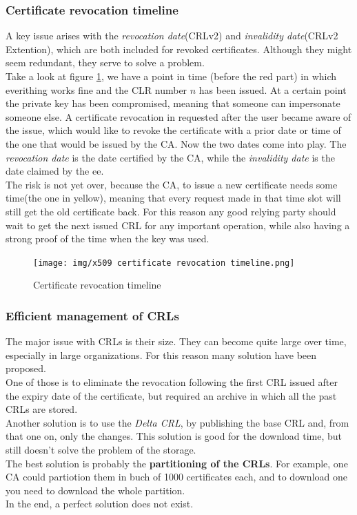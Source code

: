 \subsubsection{Certificate revocation timeline}
A key issue arises with the \textit{revocation date}(CRLv2) and
\textit{invalidity date}(CRLv2 Extention), which are both included for
revoked certificates. Although they might seem redundant, they serve
to solve a problem.\\
Take a look at figure \ref{fig:certificate revocation timeline}, we
have a point in time (before the red part) in which everithing works
fine and the CLR number $n$ has been issued. At a certain point the
private key has been compromised, meaning that someone can impersonate
someone else. A certificate revocation in requested after the user
became aware of the issue, which would like to revoke the certificate
with a prior date or time of the one that would be issued by the CA.
Now the two dates come into play. The \textit{revocation date} is the 
date certified by the CA, while the \textit{invalidity date} is the 
date claimed by the ee.\\
The risk is not yet over, because the CA, to issue a new certificate
needs some time(the one in yellow), meaning that every request made 
in that time slot will still get the old certificate back. For this
reason any good relying party should wait to get the next issued CRL
for any important operation, while also having a strong proof of the
time when the key was used.

\begin{figure}[H]
  \centering
  \texttt{[image: img/x509 certificate
  revocation timeline.png]}

  \caption{Certificate revocation timeline}
  \label{fig:certificate revocation timeline}
\end{figure}
\subsubsection{Efficient management of CRLs}
The major issue with CRLs is their size. They can become quite large
over time, especially in large organizations. For this reason many
solution have been proposed.\\
One of those is to eliminate the revocation following the first CRL
issued after the expiry date of the certificate, but required an
archive in which all the past CRLs are stored.\\
Another solution is to use the \textit{Delta CRL}, by publishing the
base CRL and, from that one on, only the changes. This solution is
good for the download time, but still doesn't solve the problem of the 
storage.\\
The best solution is probably the \textbf{partitioning of the CRLs}.
For example, one CA could partiotion them in buch of 1000 certificates 
each, and to download one you need to download the whole partition.\\
In the end, a perfect solution does not exist.

